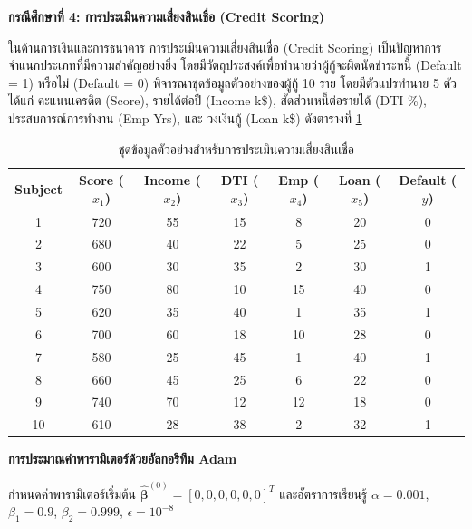 \textbf{กรณีศึกษาที่ 4: การประเมินความเสี่ยงสินเชื่อ (Credit Scoring)}

ในด้านการเงินและการธนาคาร การประเมินความเสี่ยงสินเชื่อ (Credit Scoring) เป็นปัญหาการจำแนกประเภทที่มีความสำคัญอย่างยิ่ง โดยมีวัตถุประสงค์เพื่อทำนายว่าผู้กู้จะผิดนัดชำระหนี้ (Default = 1) หรือไม่ (Default = 0) พิจารณาชุดข้อมูลตัวอย่างของผู้กู้ 10 ราย โดยมีตัวแปรทำนาย 5 ตัว ได้แก่ คะแนนเครดิต (Score), รายได้ต่อปี (Income k\$), สัดส่วนหนี้ต่อรายได้ (DTI \%), ประสบการณ์การทำงาน (Emp Yrs), และ วงเงินกู้ (Loan k\$) ดังตารางที่ \ref{tab:credit_data}

\begin{table}[h!]
\centering
\caption{ชุดข้อมูลตัวอย่างสำหรับการประเมินความเสี่ยงสินเชื่อ}
\label{tab:credit_data}
\renewcommand{\arraystretch}{1.2}
\small
\begin{tabular}{|c|c|c|c|c|c|c|}
\hline
\textbf{Subject} & \textbf{Score ($x_1$)} & \textbf{Income ($x_2$)} & \textbf{DTI ($x_3$)} & \textbf{Emp ($x_4$)} & \textbf{Loan ($x_5$)} & \textbf{Default ($y$)} \\
\hline
1 & 720 & 55 & 15 & 8  & 20 & 0 \\
2 & 680 & 40 & 22 & 5  & 25 & 0 \\
3 & 600 & 30 & 35 & 2  & 30 & 1 \\
4 & 750 & 80 & 10 & 15 & 40 & 0 \\
5 & 620 & 35 & 40 & 1  & 35 & 1 \\
6 & 700 & 60 & 18 & 10 & 28 & 0 \\
7 & 580 & 25 & 45 & 1  & 40 & 1 \\
8 & 660 & 45 & 25 & 6  & 22 & 0 \\
9 & 740 & 70 & 12 & 12 & 18 & 0 \\
10 & 610 & 28 & 38 & 2  & 32 & 1 \\
\hline
\end{tabular}
\end{table}

\textbf{การประมาณค่าพารามิเตอร์ด้วยอัลกอริทึม Adam}

กำหนดค่าพารามิเตอร์เริ่มต้น $\hat{\boldsymbol{\beta}}^{(0)} = [0, 0, 0, 0, 0, 0]^T$ และอัตราการเรียนรู้ $\alpha = 0.001$, $\beta_1 = 0.9$, $\beta_2 = 0.999$, $\epsilon = 10^{-8}$


